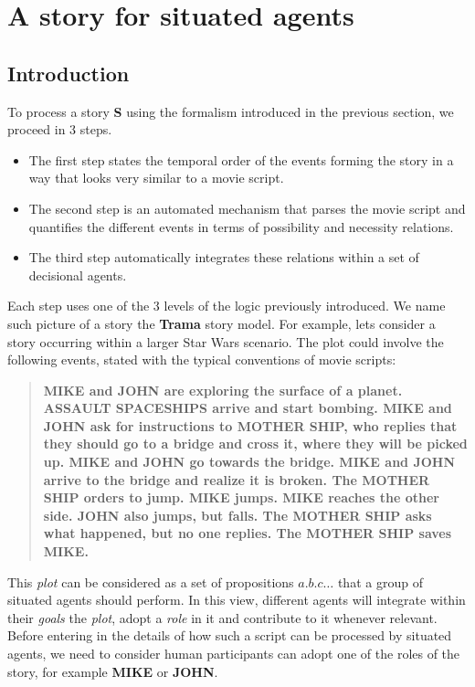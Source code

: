 \documentclass[
		twoside,openright,titlepage,numbers=noenddot,manychapters,
		headinclude,%
                footinclude=false,cleardoublepage=empty,
                BCOR=5mm,
		fontsize=11pt, %
                 enabledeprecatedfontcommands]{scrreprt}
\begin{document}
\section{A story for situated agents}

\subsection{Introduction}
To process a story \textbf{S} using the formalism introduced in the previous section, we proceed in 3 steps.
\begin{itemize}
\item	The first step states the temporal order of the events forming the story in a way that looks very similar to a movie script.
\item	The second step is an automated mechanism that parses the movie script and quantifies the different events in terms of possibility and necessity relations. 
\item	The third step automatically integrates these relations within a set of decisional agents.

\end{itemize}

Each step uses one of the 3 levels of the logic previously introduced. We name such picture of a story the \textbf{Trama} story model. For example, lets consider a story occurring within a larger Star Wars scenario. The plot could involve the following events, stated with the typical conventions of movie scripts: 


\begin{quote}\begin{small}\bf
MIKE and JOHN are exploring the surface of a planet. ASSAULT SPACESHIPS arrive and start bombing. MIKE and JOHN ask for instructions to MOTHER SHIP, who replies that they should go to a bridge and cross it, where they will be picked up. MIKE and JOHN go towards the bridge. MIKE and JOHN arrive to the bridge and realize it is broken. The MOTHER SHIP orders to jump. MIKE jumps. MIKE reaches the other side. JOHN also jumps, but falls. The MOTHER SHIP asks what happened, but no one replies. The MOTHER SHIP saves MIKE.\end{small}
\end{quote}

This \emph{plot} can be considered as a set of propositions $a.b.c…$ that a group of situated agents should perform. In this view, different agents will integrate within their \emph{goals} the \emph{plot}, adopt a \emph{role} in it and contribute to it whenever relevant. Before entering in the details of how such a script can be processed by situated agents, we need to consider human participants can adopt one of the roles of the story, for example \textbf{MIKE} or \textbf{JOHN}.
\end{document}
